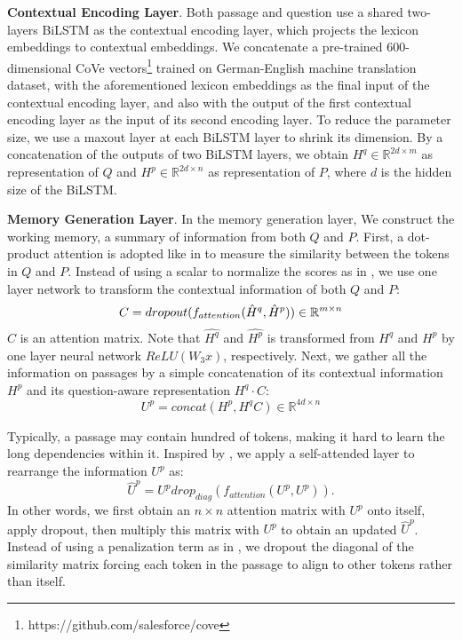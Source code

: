 \documentclass[11pt,a4paper]{article}
\begin{document}
\textbf{Contextual Encoding Layer}. Both passage and question use a shared two-layers BiLSTM as the contextual encoding layer, which projects the lexicon embeddings to contextual embeddings. We  concatenate a pre-trained 600-dimensional CoVe vectors\footnote{https://github.com/salesforce/cove} \cite{mccann2017learned} trained on German-English machine translation dataset, with the aforementioned lexicon embeddings as the final input of the contextual encoding layer, and also with the output of the first contextual encoding layer as the input of its second encoding layer.  To reduce the parameter size, we use a maxout layer \cite{goodfellow2013maxout} at each BiLSTM layer to shrink its dimension. By a concatenation of the outputs of two BiLSTM layers, we obtain $H^q\in \mathbb{R}^{2d \times m}$ as representation of $Q$ and $H^p\in \mathbb{R}^{2d \times n}$ as representation of $P$, where $d$ is the hidden size of the BiLSTM. 

\textbf{Memory Generation Layer}. In the memory generation layer, We construct the working memory, a summary of information from both $Q$ and $P$. 
First, a dot-product attention is adopted like in \cite{vaswani2017attention} to measure the similarity between the tokens in $Q$ and $P$.
Instead of using a scalar to normalize the scores as in \cite{vaswani2017attention}, we use one layer network to transform the contextual information of both $Q$ and $P$:
\vspace{-0.1cm}
\begin{equation}
C=dropout(f_{attention}(\hat{H}^q, \hat{H}^p)) \in \mathbb{R}^{m \times n}\\
\label{eq:align}
\end{equation}
$C$ is an attention matrix. 
Note that $\hat{H^q}$ and $\hat{H^p}$ is transformed from $H^q$ and $H^p$ by one layer neural network $ReLU(W_3x)$, respectively. 
Next, we gather all the information on passages by a simple concatenation of its contextual information $H^p$ and its question-aware representation $H^q \cdot C$:
\begin{equation}
U^p = concat(H^p, H^qC) \in \mathbb{R}^{4d \times n}
\label{eq:gather}
\end{equation}

Typically, a passage may contain hundred of tokens, making it hard to learn the long dependencies within it. Inspired by \cite{lin2017structured}, we apply a self-attended layer to rearrange the information $U^p$ as: 
\begin{equation}
\hat{U}^p = U^p drop_{diag}(f_{attention}(U^p, U^p)).
\label{eq:self}
\end{equation}
In other words, we first obtain an $n \times n$ attention matrix with $U^p$ onto itself, apply dropout, then multiply this matrix with $U^p$ to obtain an updated $\hat{U}^p$.
Instead of using a penalization term as in \cite{lin2017structured}, we dropout the diagonal of the similarity matrix forcing each token in the passage to align to other tokens rather than itself.
\end{document}
